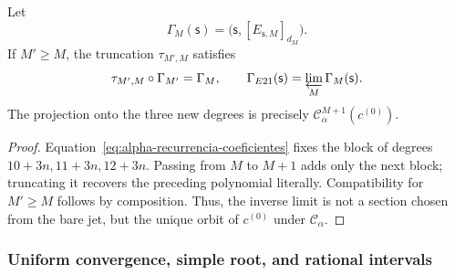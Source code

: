 \begin{proposition}
\label{prop:alpha-naturalidad-recurrencia-explicita}
Let
\[
 \Gamma_M(\mathsf s)
 =\bigl(\mathsf s,[E_{\mathsf s,M}]_{d_M}\bigr).
\]
If \(M'\geq M\), the truncation \(\tau_{M',M}\) satisfies
\begin{equation}
 \tau_{M',M}\circ\Gamma_{M'}=\Gamma_M,
 \qquad
 \Gamma_{E21}(\mathsf s)=\varprojlim_M\Gamma_M(\mathsf s).
 \label{eq:alpha-naturalidad-explicita}
\end{equation}
The projection onto the three new degrees is precisely
\(\mathcal C_\alpha^{M+1}(c^{(0)})\).
\end{proposition}

\begin{proof}
Equation~\eqref{eq:alpha-recurrencia-coeficientes} fixes the block of degrees
\(10+3n,11+3n,12+3n\). Passing from \(M\) to \(M+1\) adds only the next
block; truncating it recovers the preceding polynomial literally.
Compatibility for \(M'\geq M\) follows by composition. Thus, the inverse
limit is not a section chosen from the bare jet, but the unique orbit of
\(c^{(0)}\) under \(\mathcal C_\alpha\).
\end{proof}

\subsubsection{Uniform convergence, simple root, and rational intervals}
\label{subsec:alpha-cotas-completas-rev08}

